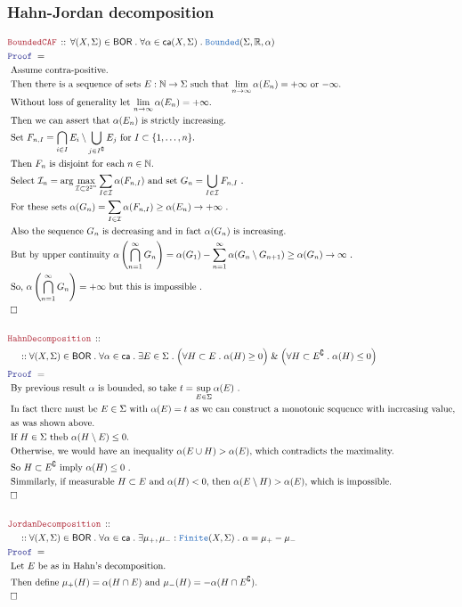 \documentclass[12pt]{scrartcl}
\newcommand{\TYPE}[1]{\textcolor{NavyBlue}{\mathtt{#1}}}
\newcommand{\LOGIC}[1]{\textcolor{Blue}{\mathtt{#1}}}
\newcommand{\THM}[1]{\textcolor{Maroon}{\mathtt{#1}}}
\renewcommand{\.}{\; . \;}
\newcommand{\Theorem}[2]{& \THM{#1} \, :: \, #2 \\ & \Proof = \\ }
\newcommand{\NewLine}{\\ & \kern 1pc}
\newcommand{\Page}[1]{ \begin{align*} #1 \end{align*}   }
\renewcommand{\And}{\; \& \;}
\newcommand{\Reals}{\mathbb{R} }
\newcommand{\Nat}{\mathbb{N} }
\renewcommand{\c}{\complement}
\newcommand{\QED}{\; \square}
\newcommand{\EndProof}{& \QED \\}
\newcommand{\Proof}{\LOGIC{Proof} \; }
\newcommand{\Explain}[1]{& \text{#1.} \\}
\newcommand{\ExplainFurther}[1]{& \text{#1} \\}
\newcommand{\Finite}{\TYPE{Finite}}
\newcommand{\I}{\mathcal{I}}
\newcommand{\BOR}{\mathsf{BOR}}
\newcommand{\caf}{\mathsf{ca}}
\begin{document}
\subsubsection{Hahn-Jordan decomposition}
\Page{
	\Theorem{BoundedCAF}
	{
		\forall (X,\Sigma) \in \BOR \.
		\forall \alpha \in \caf(X,\Sigma) \.
		\TYPE{Bounded}(\Sigma,\Reals,\alpha)
	}
	\Explain{
		Assume contra-positive}
	\Explain{
		Then there is a sequence of sets $E : \Nat \to \Sigma $
		such that $\lim_{n\to \infty} \alpha(E_n) = +\infty$ or $-\infty$}
	\Explain{
		Without loss of generality let $\lim_{n\to \infty} \alpha(E_n) = +\infty$}
	\Explain{
		Then we can assert that $\alpha(E_n)$ is strictly increasing}
	\Explain{
			Set  $F_{n,I} =\bigcap_{i \in I} E_i \setminus \bigcup_{j \in I^\c} E_j$
			for $I \subset \{1,\ldots,n\} $}
	\Explain{
		Then $F_n$ is disjoint for each $n \in \Nat$}
	\Explain{
		Select $\I_n=\arg\max_{\I \subset 2^{2^n}} \sum_{I \in \I} \alpha(F_{n,I})$
		and set $G_n = \bigcup_{I \in \I} F_{n,I}$ 
	}
	\Explain{
		For these sets $\alpha(G_n) = \sum_{I \in \I} \alpha(F_{n,I}) \ge \alpha(E_n) \to +\infty$
	}
	\Explain{
		Also the sequence $G_n$ is decreasing and in fact $\alpha(G_n)$ is increasing}
	\Explain{
		But by upper continuity
		$
			\alpha\left(\bigcap^\infty_{n=1} G_n\right) = \alpha(G_1) - \sum^\infty_{n=1} 
			\alpha(G_n \setminus G_{n+1}) \ge \alpha(G_n) \to \infty			
		$		}
	\Explain{
		So, $\alpha\left(\bigcap^\infty_{n=1} G_n\right) = + \infty$ but this is impossible
	}
	\EndProof
	\\
	\Theorem{HahnDecomposition}
	{
		\NewLine ::		
		\forall (X,\Sigma) \in \BOR \.
		\forall \alpha \in \caf \.
		\exists E \in \Sigma \.
		\Big(\forall  H \subset E  \. \alpha(H) \ge 0\Big)
		\And
		\Big(\forall H \subset E^\c \. \alpha(H) \le 0 \Big)
	}
	\Explain{
		By previous result $\alpha$ is bounded, so take $t = \sup_{E \in \Sigma} \alpha(E)$
	}
	\ExplainFurther{
		In fact there must be $E \in \Sigma$ with $\alpha(E) = t$ as we can construct a monotonic 
		sequence with increasing value,}\Explain{ as was shown above}
	\Explain{
		If $H \in \Sigma$ theb $\alpha(H \setminus E) \le 0$}
	\Explain{
		Otherwise, we would have an inequality	$\alpha(E \cup H) > \alpha(E)$,
		which contradicts the maximality}
	\Explain{
		So $H \subset E^\c$ imply $\alpha(H) \le 0$
	}
	\Explain{
		Simmilarly, if measurable $H \subset E$ and $\alpha(H) < 0$,
		then $\alpha(E \setminus H) > \alpha(E)$,
		which is impossible}
	\EndProof
	\\
	\Theorem{JordanDecomposition}
	{
		\NewLine ::		
		\forall (X,\Sigma) \in \BOR \.
		\forall \alpha \in \caf \.
		\exists \mu_+, \mu_- : \Finite(X,\Sigma) \.
		\alpha = \mu_+ - \mu_-
	}
	\Explain{ 
		Let $E$ be as in Hahn's decomposition}
	\Explain{
		Then define $\mu_+(H) = \alpha(H \cap E)$ 
		and $\mu_-(H) = -\alpha(H \cap E^\c)$}
	\EndProof
}
\newpage
\end{document}
